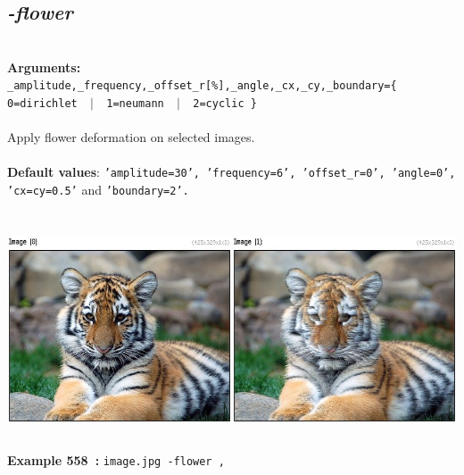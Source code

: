 \documentclass[a4paper,11pt,twoside]{book}
\begin{document}
\subsection{\emph{-flower} }\vspace*{-0.5em}
~\\\textbf{Arguments: } 
{\small \texttt{\_amplitude,\_frequency,\_offset\_r[\%],\_angle,\_cx,\_cy,\_boundary=\{ 0=dirichlet ~$|$~ 1=neumann ~$|$~ 2=cyclic \}}}\\~\\
Apply flower deformation on selected images.
~\\~\\\textbf{Default values}: {\small \texttt{'amplitude=30', 'frequency=6', 'offset\_r=0', 'angle=0', 'cx=cy=0.5'} and \texttt{'boundary=2'.}}
\begin{center}\includegraphics[keepaspectratio=true,height=7cm,width=\textwidth]{img/gmic_def558.jpg}\\
{\footnotesize \textbf{Example 558~:} \texttt{image.jpg -flower ,}}
\end{center}
\end{document}
